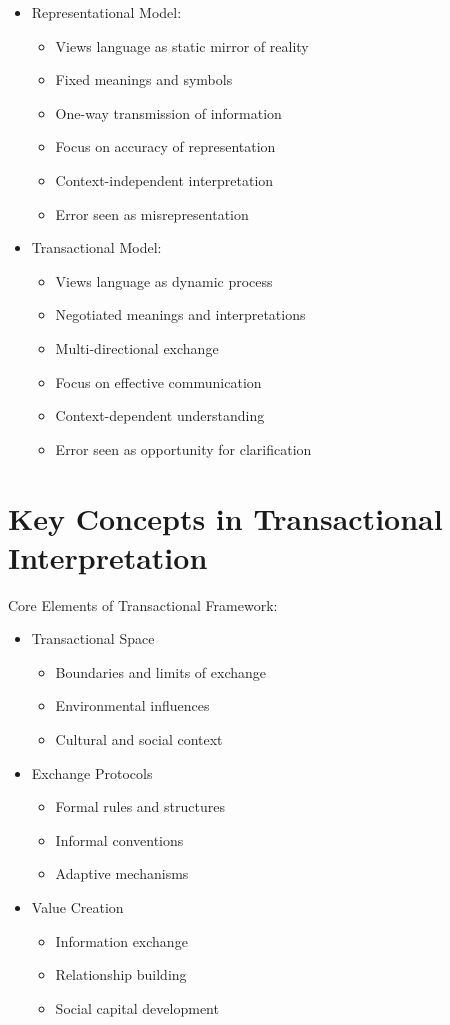 \documentclass[12pt]{article}
\begin{document}
\begin{itemize}
\item Representational Model:
  \begin{itemize}
  \item Views language as static mirror of reality
  \item Fixed meanings and symbols
  \item One-way transmission of information
  \item Focus on accuracy of representation
  \item Context-independent interpretation
  \item Error seen as misrepresentation
  \end{itemize}

\item Transactional Model:
  \begin{itemize}
  \item Views language as dynamic process
  \item Negotiated meanings and interpretations
  \item Multi-directional exchange
  \item Focus on effective communication
  \item Context-dependent understanding
  \item Error seen as opportunity for clarification
  \end{itemize}
\end{itemize}

\section{Key Concepts in Transactional Interpretation}

Core Elements of Transactional Framework:
\begin{itemize}
\item Transactional Space
  \begin{itemize}
  \item Boundaries and limits of exchange
  \item Environmental influences
  \item Cultural and social context
  \end{itemize}
\item Exchange Protocols
  \begin{itemize}
  \item Formal rules and structures
  \item Informal conventions
  \item Adaptive mechanisms
  \end{itemize}
\item Value Creation
  \begin{itemize}
  \item Information exchange
  \item Relationship building
  \item Social capital development
  \end{itemize}
\end{itemize}
\end{document}
